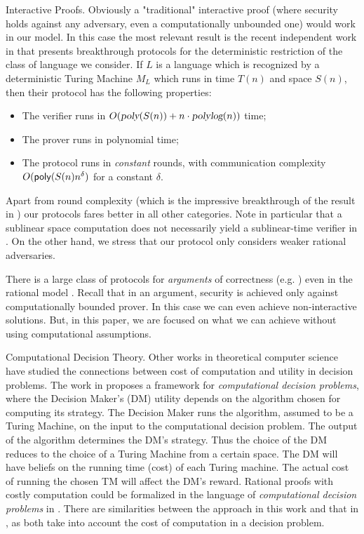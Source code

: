 {\sc Interactive Proofs.}
Obviously a "traditional" interactive proof (where security holds against any adversary, even a computationally unbounded one) would work in our model. In this case the most relevant result is 
the recent independent work in \cite{rrr16} that presents breakthrough protocols for the deterministic restriction of the class of language we consider. If $L$ is a language which is recognized by a deterministic Turing Machine $M_L$ which runs in time $T(n)$ and space $S(n)$, then their protocol has the following properties: 
\begin{itemize}
\item The verifier runs in 
$O({\textsl{poly}}(S(n)) + n \cdot{\ensuremath{\textsl{polylog}}}(n))$ time;
\item The prover runs in polynomial time;
\item The protocol runs in {\em constant} rounds, with communication complexity $O({\sf poly}(S(n)n^{\delta})$ for a constant $\delta$.
\end{itemize}
Apart from round complexity (which is the impressive breakthrough of the result in \cite{rrr16}) our protocols fares better in all other categories. Note in particular that a sublinear space computation does not necessarily yield a sublinear-time verifier in 
\cite{rrr16}. On the other hand, we stress that our protocol only considers weaker rational adversaries. 

\medskip
{}
There is a large class of protocols for {\em arguments} of correctness (e.g. \cite{ggp10,ggpr13,krr14}) even in the rational model \cite{ratargs,ratsumchecks}. Recall that in an argument, security is achieved only against computationally bounded prover. In this case we can even achieve non-interactive solutions. But, in this paper, we are focused on what we can achieve without using computational assumptions.

\medskip
\noindent
{\sc Computational Decision Theory.}
Other works in theoretical computer science have studied the connections between cost of computation and utility in decision problems.
The work in \cite{halpern2011don} proposes a framework for \emph{computational decision problems}, where the Decision Maker's (DM) utility depends on the algorithm chosen for computing its strategy.
The Decision Maker runs the algorithm, assumed to be a Turing Machine, on the input to the computational decision problem.
The output of the algorithm determines the DM's strategy. 
Thus the choice of the DM reduces to the choice of a Turing Machine from a certain space. The DM will have beliefs on the running time (cost) of each Turing machine. The actual cost of running the chosen TM will affect the DM's reward.
Rational proofs with costly computation could be formalized in the language of \emph{computational decision problems} in \cite{halpern2011don}. There are similarities between the approach in this
work and that in \cite{halpern2011don}, as both take into account the cost of computation in a decision problem.





